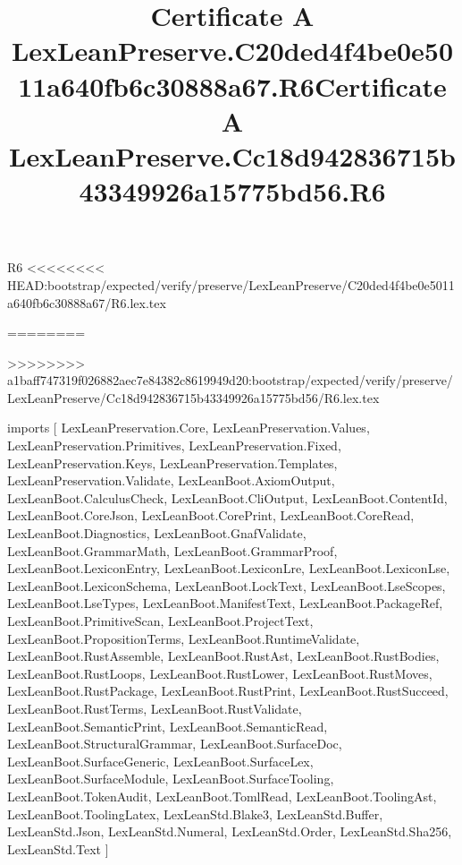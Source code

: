 \begin{lexlean}{R6}
<<<<<<<< HEAD:bootstrap/expected/verify/preserve/LexLeanPreserve/C20ded4f4be0e5011a640fb6c30888a67/R6.lex.tex
\title{Certificate A LexLeanPreserve.C20ded4f4be0e5011a640fb6c30888a67.R6}
========
\title{Certificate A LexLeanPreserve.Cc18d942836715b43349926a15775bd56.R6}
>>>>>>>> a1baff747319f026882aec7e84382c8619949d20:bootstrap/expected/verify/preserve/LexLeanPreserve/Cc18d942836715b43349926a15775bd56/R6.lex.tex
\begin{coremodule}
imports [
  LexLeanPreservation.Core,
  LexLeanPreservation.Values,
  LexLeanPreservation.Primitives,
  LexLeanPreservation.Fixed,
  LexLeanPreservation.Keys,
  LexLeanPreservation.Templates,
  LexLeanPreservation.Validate,
  LexLeanBoot.AxiomOutput,
  LexLeanBoot.CalculusCheck,
  LexLeanBoot.CliOutput,
  LexLeanBoot.ContentId,
  LexLeanBoot.CoreJson,
  LexLeanBoot.CorePrint,
  LexLeanBoot.CoreRead,
  LexLeanBoot.Diagnostics,
  LexLeanBoot.GnafValidate,
  LexLeanBoot.GrammarMath,
  LexLeanBoot.GrammarProof,
  LexLeanBoot.LexiconEntry,
  LexLeanBoot.LexiconLre,
  LexLeanBoot.LexiconLse,
  LexLeanBoot.LexiconSchema,
  LexLeanBoot.LockText,
  LexLeanBoot.LseScopes,
  LexLeanBoot.LseTypes,
  LexLeanBoot.ManifestText,
  LexLeanBoot.PackageRef,
  LexLeanBoot.PrimitiveScan,
  LexLeanBoot.ProjectText,
  LexLeanBoot.PropositionTerms,
  LexLeanBoot.RuntimeValidate,
  LexLeanBoot.RustAssemble,
  LexLeanBoot.RustAst,
  LexLeanBoot.RustBodies,
  LexLeanBoot.RustLoops,
  LexLeanBoot.RustLower,
  LexLeanBoot.RustMoves,
  LexLeanBoot.RustPackage,
  LexLeanBoot.RustPrint,
  LexLeanBoot.RustSucceed,
  LexLeanBoot.RustTerms,
  LexLeanBoot.RustValidate,
  LexLeanBoot.SemanticPrint,
  LexLeanBoot.SemanticRead,
  LexLeanBoot.StructuralGrammar,
  LexLeanBoot.SurfaceDoc,
  LexLeanBoot.SurfaceGeneric,
  LexLeanBoot.SurfaceLex,
  LexLeanBoot.SurfaceModule,
  LexLeanBoot.SurfaceTooling,
  LexLeanBoot.TokenAudit,
  LexLeanBoot.TomlRead,
  LexLeanBoot.ToolingAst,
  LexLeanBoot.ToolingLatex,
  LexLeanStd.Blake3,
  LexLeanStd.Buffer,
  LexLeanStd.Json,
  LexLeanStd.Numeral,
  LexLeanStd.Order,
  LexLeanStd.Sha256,
  LexLeanStd.Text
]


\end{coremodule}
\end{lexlean}
